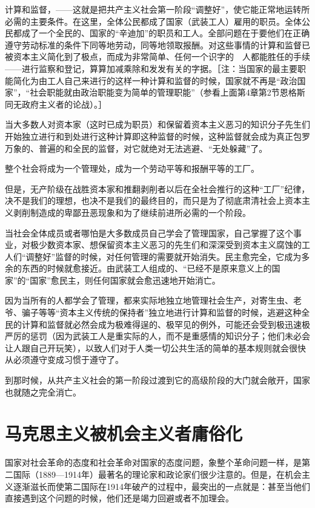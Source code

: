 \documentclass[UTF8, 12pt, a4paper]{ctexrep}
\begin{document}
计算和监督，——这就是把共产主义社会第一阶段“调整好”，使它能正常地运转所必需的主要条件。在这里，全体公民都成了国家（武装工人）雇用的职员。全体公民都成了一个全民的、国家的“辛迪加”的职员和工人。全部问题在于要他们在正确遵守劳动标准的条件下同等地劳动，同等地领取报酬。对这些事情的计算和监督已被资本主义简化到了极点，而成为非常简单、任何一个识字的　人都能胜任的手续——进行监察和登记，算算加减乘除和发发有关的字据。［注：当国家的最主要职能简化为由工人自己来进行的这样一种计算和监督的时候，国家就不再是“政治国家”，“社会职能就由政治职能变为简单的管理职能”（参看上面第4章第2节恩格斯同无政府主义者的论战）。］

当大多数人对资本家（这时已成为职员）和保留着资本主义恶习的知识分子先生们开始独立进行和到处进行这种计算即这种监督的时候，这种监督就会成为真正包罗万象的、普遍的和全民的监督，对它就绝对无法逃避、“无处躲藏”了。

整个社会将成为一个管理处，成为一个劳动平等和报酬平等的工厂。

但是，无产阶级在战胜资本家和推翻剥削者以后在全社会推行的这种“工厂”纪律，决不是我们的理想，也决不是我们的最终目的，而只是为了彻底肃清社会上资本主义剥削制造成的卑鄙丑恶现象和为了继续前进所必需的一个阶段。

当社会全体成员或者哪怕是大多数成员自己学会了管理国家，自己掌握了这个事业，对极少数资本家、想保留资本主义恶习的先生们和深深受到资本主义腐蚀的工人们“调整好”监督的时候，对任何管理的需要就开始消失。民主愈完全，它成为多余的东西的时候就愈接近。由武装工人组成的、“已经不是原来意义上的国家”的“国家”愈民主，则任何国家就会愈迅速地开始消亡。

因为当所有的人都学会了管理，都来实际地独立地管理社会生产，对寄生虫、老爷、骗子等等“资本主义传统的保持者”独立地进行计算和监督的时候，逃避这种全民的计算和监督就必然会成为极难得逞的、极罕见的例外，可能还会受到极迅速极严厉的惩罚（因为武装工人是重实际的人，而不是重感情的知识分子；他们未必会让人跟自己开玩笑），以致人们对于人类一切公共生活的简单的基本规则就会很快从必须遵守变成习惯于遵守了。

到那时候，从共产主义社会的第一阶段过渡到它的高级阶段的大门就会敞开，国家也就随之完全消亡。

\chapter{马克思主义被机会主义者庸俗化}

国家对社会革命的态度和社会革命对国家的态度问题，象整个革命问题一样，是第二国际（1889—1914年）最著名的理论家和政论家们很少注意的。但是，在机会主义逐渐滋长而使第二国际在1914年破产的过程中，最突出的一点就是：甚至当他们直接遇到这个问题的时候，他们还是竭力回避或者不加理会。
\end{document}
